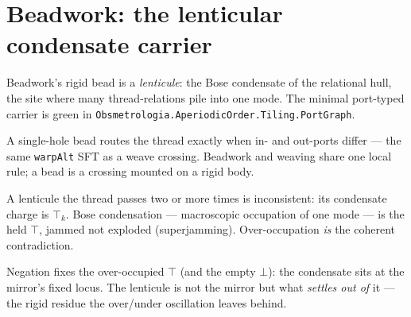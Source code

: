 \section{Beadwork: the lenticular condensate carrier}

Beadwork's rigid bead is a \emph{lenticule}: the Bose condensate of the relational hull, the site
where many thread-relations pile into one mode. The minimal port-typed carrier is green in
\texttt{Obsmetrologia.AperiodicOrder.Tiling.PortGraph}.

\begin{theorem}\label{thm:lenticule-hole}\leanok{}
A single-hole bead routes the thread exactly when in- and out-ports differ --- the same
\texttt{warpAlt} SFT as a weave crossing. Beadwork and weaving share one local rule; a bead is a
crossing mounted on a rigid body.
\end{theorem}

\begin{theorem}\label{thm:condensate-is-top}\leanok{}
A lenticule the thread passes two or more times is inconsistent: its condensate charge is $\top_k$.
Bose condensation --- macroscopic occupation of one mode --- is the held $\top$, jammed not
exploded (superjamming). Over-occupation \emph{is} the coherent contradiction.
\end{theorem}

\begin{theorem}\label{thm:condensate-from-mirror}\leanok{}
Negation fixes the over-occupied $\top$ (and the empty $\bot$): the condensate sits at the mirror's
fixed locus. The lenticule is not the mirror but what \emph{settles out of} it --- the rigid residue
the over/under oscillation leaves behind.
\end{theorem}

